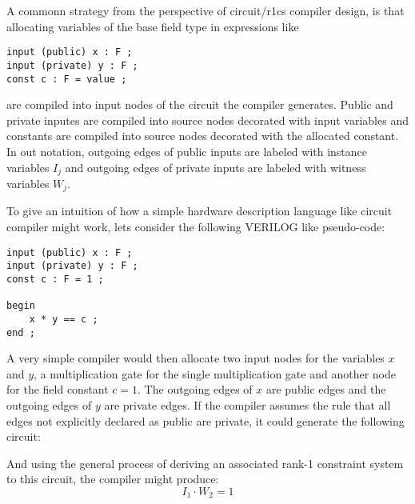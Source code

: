 A commonn strategy from the perspective of circuit/r1cs compiler design, is that allocating variables of the base field type in expressions like
\begin{lstlisting}
input (public) x : F ; 
input (private) y : F ; 
const c : F = value ; 
\end{lstlisting} 
are compiled into input nodes of the circuit the compiler generates. Public and private inputes are compiled into source nodes decorated with input variables and constants are compiled into source nodes decorated with the allocated constant. In out notation, outgoing edges of public inputs are labeled with instance variables $I_j$ and outgoing edges of private inputs are labeled with witness variables $W_j$.
\begin{example} To give an intuition of how a simple hardware description language like circuit compiler might work, lets consider the following VERILOG like pseudo-code:
\begin{lstlisting}
input (public) x : F ; 
input (private) y : F ; 
const c : F = 1 ; 

begin
	x * y == c ;
end ;
\end{lstlisting}
A very simple compiler would then allocate two input nodes for the variables $x$ and $y$, a multiplication gate for the single multiplication gate and another node for the field constant $c=1$. The outgoing edges of $x$ are public edges and the outgoing edges of $y$ are private edges. If the compiler assumes the rule that all edges not explicitly declared as public are private, it could generate the following circuit: 
\begin{center}
\end{center} 
And using the general process of deriving an associated rank-1 constraint system to this circuit, the compiler might produce:
$$
I_1 \cdot W_2 =1
$$
\end{example} 
